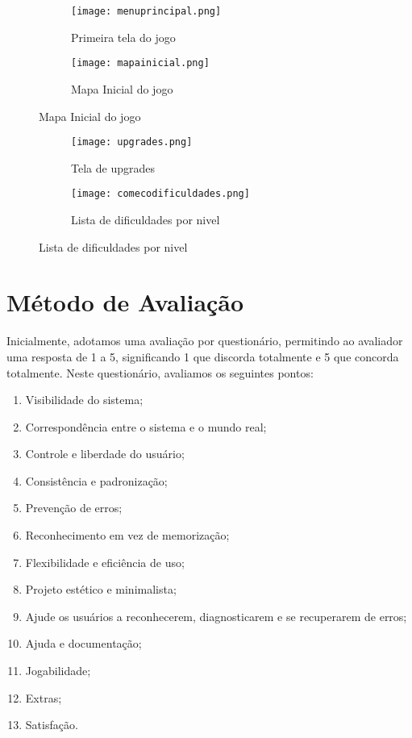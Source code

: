 \documentclass[12pt]{article}
\begin{document}
\begin{figure}[h]
\begin{subfigure}{0.5\textwidth}
\texttt{[image: menuprincipal.png]}
\caption{Primeira tela do jogo}
\label{fig:menuprincipal}
\end{subfigure}
\begin{subfigure}{0.5\textwidth}
\texttt{[image: mapainicial.png]} 
\caption{Mapa Inicial do jogo}
\label{fig:mapainicial}
\end{subfigure}
\end{figure}

\begin{figure}[h]
\begin{subfigure}{0.5\textwidth}
\texttt{[image: upgrades.png]}
\caption{Tela de upgrades}
\label{fig:upgrades}
\end{subfigure}
\begin{subfigure}{0.5\textwidth}
\texttt{[image: comecodificuldades.png]} 
\caption{Lista de dificuldades por nivel}
\label{fig:comecodificuldades}
\end{subfigure}
\end{figure}
\newpage
\section{Método de Avaliação}

    Inicialmente, adotamos uma avaliação por questionário, permitindo ao avaliador uma resposta de 1 a 5, significando 1 que discorda totalmente e 5 que concorda totalmente. Neste questionário, avaliamos os seguintes pontos:
        \begin{enumerate}
        \item Visibilidade do sistema;
        \item Correspondência entre o sistema e o mundo real;
        \item Controle e liberdade do usuário;
        \item Consistência e padronização;
        \item Prevenção de erros;
        \item Reconhecimento em vez de memorização;
        \item Flexibilidade e eficiência de uso;
        \item Projeto estético e minimalista;
        \item Ajude os usuários a reconhecerem, diagnosticarem e se recuperarem de erros;
        \item Ajuda e documentação;
        \item Jogabilidade;
        \item Extras;
        \item Satisfação.
        \end{enumerate}
        
\end{document}
